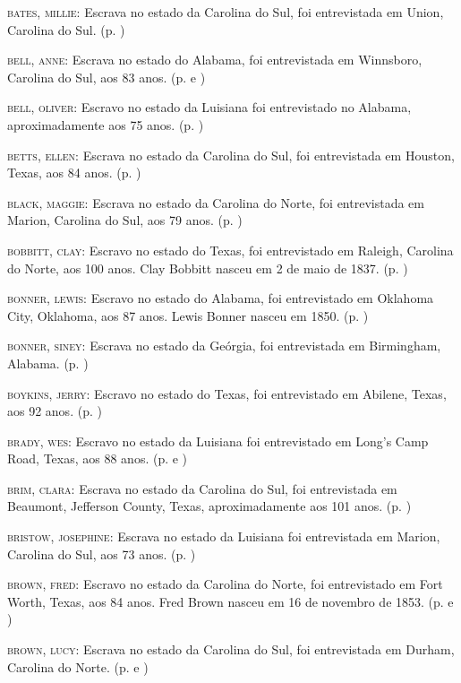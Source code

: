 \begin{Parskip}
\textsc{bates, millie:} Escrava no estado da Carolina do Sul, foi
entrevistada em Union, Carolina do Sul. (p. \pageref{ref21})

\textsc{bell, anne:} Escrava no estado do Alabama, foi entrevistada em
Winnsboro, Carolina do Sul, aos 83 anos. (p. \pageref{ref22} e \pageref{ref23})

\textsc{bell, oliver:} Escravo no estado da Luisiana foi entrevistado no
Alabama, aproximadamente aos 75 anos. (p. \pageref{ref24})

\textsc{betts, ellen:} Escrava no estado da Carolina do Sul, foi
entrevistada em Houston, Texas, aos 84 anos. (p. \pageref{ref25})

\textsc{black, maggie:} Escrava no estado da Carolina do Norte, foi
entrevistada em Marion, Carolina do Sul, aos 79 anos. (p. \pageref{ref26})

\textsc{bobbitt, clay:} Escravo no estado do Texas, foi entrevistado em
Raleigh, Carolina do Norte, aos 100 anos. Clay Bobbitt nasceu em 2 de
maio de 1837. (p. \pageref{ref27})

\textsc{bonner, lewis:} Escravo no estado do Alabama, foi entrevistado
em Oklahoma City, Oklahoma, aos 87 anos. Lewis Bonner nasceu em 1850. (p. \pageref{ref28})

\textsc{bonner, siney:} Escrava no estado da Geórgia, foi entrevistada
em Birmingham, Alabama. (p. \pageref{ref29})

\textsc{boykins, jerry:} Escravo no estado do Texas, foi entrevistado em
Abilene, Texas, aos 92 anos. (p. \pageref{ref30})

\textsc{brady, wes:} Escravo no estado da Luisiana foi entrevistado em
Long's Camp Road, Texas, aos 88 anos. (p. \pageref{ref31} e \pageref{ref32})

\textsc{brim, clara:} Escrava no estado da Carolina do Sul, foi
entrevistada em Beaumont, Jefferson County, Texas, aproximadamente aos
101 anos. (p. \pageref{ref33})

\textsc{bristow, josephine:} Escrava no estado da Luisiana foi
entrevistada em Marion, Carolina do Sul, aos 73 anos. (p. \pageref{ref34})

\textsc{brown, fred:} Escravo no estado da Carolina do Norte, foi
entrevistado em Fort Worth, Texas, aos 84 anos. Fred Brown nasceu em 16
de novembro de 1853. (p. \pageref{ref35} e \pageref{ref36})

\textsc{brown, lucy:} Escrava no estado da Carolina do Sul, foi
entrevistada em Durham, Carolina do Norte. (p. \pageref{ref37} e \pageref{ref38})


\end{Parskip}
